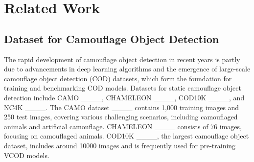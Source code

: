 \section{Related Work}
\subsection{Dataset for Camouflage Object Detection}



The rapid development of camouflage object detection in recent years is partly due to advancements in deep learning algorithms and the emergence of large-scale camouflage object detection (COD) datasets, which form the foundation for training and benchmarking COD models. Datasets for static camouflage object detection include CAMO ____, CHAMELEON ____, COD10K ____, and NC4K ____. The CAMO dataset ____ contains 1,000 training images and 250 test images, covering various challenging scenarios, including camouflaged animals and artificial camouflage. CHAMELEON ____ consists of 76 images, focusing on camouflaged animals. COD10K ____, the largest camouflage object dataset, includes around 10000 images and is frequently used for pre-training VCOD models.

